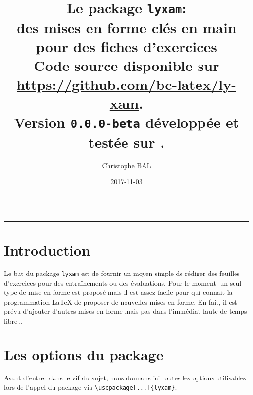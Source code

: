 \documentclass[12pt,a4paper]{article}
\theoremstyle{definition}
\begin{document}
\title{%
	Le package \texttt{lyxam}:\\%
	des mises en forme clés en main\\%
	pour des fiches d'exercices\\%
	{\footnotesize Code source disponible sur \url{https://github.com/bc-latex/ly-xam}.}\\%
	{\footnotesize Version \texttt{0.0.0-beta} développée et testée sur \macosxname{}.}%
}
\author{Christophe BAL}
\date{2017-11-03}

\maketitle


\vspace{2em}

\hrule

\tableofcontents

\vspace{1.5em}

\hrule

\newpage



\section{Introduction}

Le but du package \verb+lyxam+ est de fournir un moyen simple de rédiger des feuilles d'exercices pour des entraînements ou des évaluations.
Pour le moment, un seul type de mise en forme est proposé mais il est assez facile pour qui connait la programmation \LaTeX{} de proposer de nouvelles mises en forme.
En fait, il est prévu d'ajouter d'autres mises en forme mais pas dans l'immédiat faute de temps libre...




\section{Les options du package}

Avant d'entrer dans le vif du sujet, nous donnons ici toutes les options utilisables lors de l'appel du package via \verb+\usepackage[...]{lyxam}+.
\end{document}
